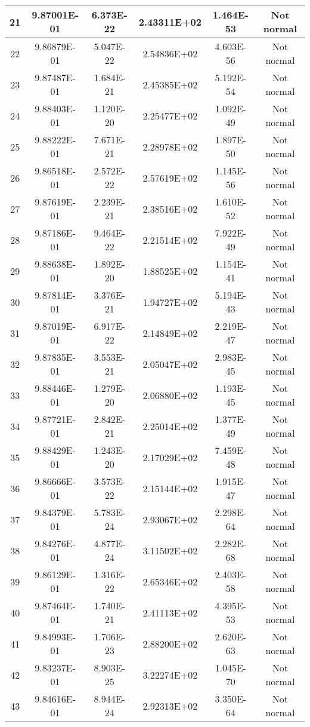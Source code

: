 \begin{table}[h]
\begin{tabular}{|c|c|c|c|c|c|}
		21 & 9.87001E-01 & 6.373E-22 & 2.43311E+02 & 1.464E-53 & Not normal\\\hline
		22 & 9.86879E-01 & 5.047E-22 & 2.54836E+02 & 4.603E-56 & Not normal\\\hline
		23 & 9.87487E-01 & 1.684E-21 & 2.45385E+02 & 5.192E-54 & Not normal\\\hline
		24 & 9.88403E-01 & 1.120E-20 & 2.25477E+02 & 1.092E-49 & Not normal\\\hline
		25 & 9.88222E-01 & 7.671E-21 & 2.28978E+02 & 1.897E-50 & Not normal\\\hline
		26 & 9.86518E-01 & 2.572E-22 & 2.57619E+02 & 1.145E-56 & Not normal\\\hline
		27 & 9.87619E-01 & 2.239E-21 & 2.38516E+02 & 1.610E-52 & Not normal\\\hline
		28 & 9.87186E-01 & 9.464E-22 & 2.21514E+02 & 7.922E-49 & Not normal\\\hline
		29 & 9.88638E-01 & 1.892E-20 & 1.88525E+02 & 1.154E-41 & Not normal\\\hline
		30 & 9.87814E-01 & 3.376E-21 & 1.94727E+02 & 5.194E-43 & Not normal\\\hline
		31 & 9.87019E-01 & 6.917E-22 & 2.14849E+02 & 2.219E-47 & Not normal\\\hline
		32 & 9.87835E-01 & 3.553E-21 & 2.05047E+02 & 2.983E-45 & Not normal\\\hline
		33 & 9.88446E-01 & 1.279E-20 & 2.06880E+02 & 1.193E-45 & Not normal\\\hline
		34 & 9.87721E-01 & 2.842E-21 & 2.25014E+02 & 1.377E-49 & Not normal\\\hline
		35 & 9.88429E-01 & 1.243E-20 & 2.17029E+02 & 7.459E-48 & Not normal\\\hline
		36 & 9.86666E-01 & 3.573E-22 & 2.15144E+02 & 1.915E-47 & Not normal\\\hline
		37 & 9.84379E-01 & 5.783E-24 & 2.93067E+02 & 2.298E-64 & Not normal\\\hline
		38 & 9.84276E-01 & 4.877E-24 & 3.11502E+02 & 2.282E-68 & Not normal\\\hline
		39 & 9.86129E-01 & 1.316E-22 & 2.65346E+02 & 2.403E-58 & Not normal\\\hline
		40 & 9.87464E-01 & 1.740E-21 & 2.41113E+02 & 4.395E-53 & Not normal\\\hline
		41 & 9.84993E-01 & 1.706E-23 & 2.88200E+02 & 2.620E-63 & Not normal\\\hline
		42 & 9.83237E-01 & 8.903E-25 & 3.22274E+02 & 1.045E-70 & Not normal\\\hline
		43 & 9.84616E-01 & 8.944E-24 & 2.92313E+02 & 3.350E-64 & Not normal\\\hline

\end{tabular}
\end{table}

